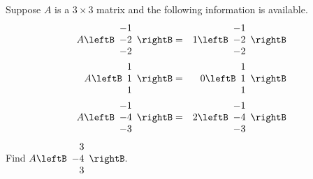\begin{enumialphparenastyle}
\begin{ex} Suppose $A$ is a $3\times 3$ matrix and the following information is
available.
\begin{eqnarray*}
A\leftB
\begin{array}{r}
-1 \\
-2 \\
-2
\end{array}
\rightB &=&1\leftB
\begin{array}{r}
-1 \\
-2 \\
-2
\end{array}
\rightB \\
A\leftB
\begin{array}{r}
1 \\
1 \\
1
\end{array}
\rightB &=& 0\leftB
\begin{array}{r}
1 \\
1 \\
1
\end{array}
\rightB \\
A\leftB
\begin{array}{r}
-1 \\
-4 \\
-3
\end{array}
\rightB &=&2\leftB
\begin{array}{r}
-1 \\
-4 \\
-3
\end{array}
\rightB
\end{eqnarray*}
Find $A\leftB
\begin{array}{r}
3 \\
-4 \\
3
\end{array}
\rightB. $
\end{ex}


\end{enumialphparenastyle}
